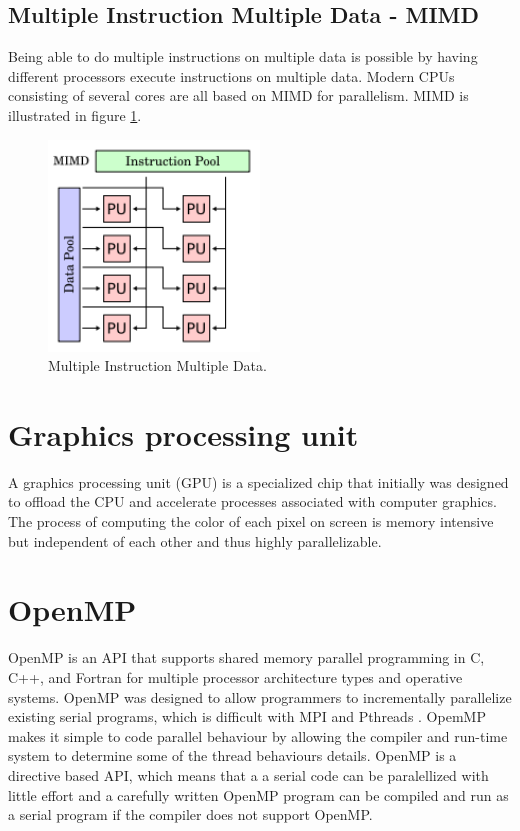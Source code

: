 \subsection*{Multiple Instruction Multiple Data - MIMD}
Being able to do multiple instructions on multiple data is possible by having different processors execute instructions on multiple data. Modern CPUs consisting of several cores are all based on MIMD for parallelism. MIMD is illustrated in figure \ref{MIMD}.
\begin{figure}[h!]
\centering
\includegraphics[width=0.50\textwidth]{parallel/MIMD}
\caption{Multiple Instruction Multiple Data.}
\label{MIMD}
\end{figure}

\section{Graphics processing unit}
A graphics processing unit (GPU) is a specialized chip that initially was designed to offload the CPU and accelerate processes associated with computer graphics. The process of computing the color of each pixel on screen is memory intensive but independent of each other and thus highly parallelizable. 

\section{OpenMP}
OpenMP is an API that supports shared memory parallel programming in C, C++, and Fortran for multiple processor architecture types and operative systems. OpenMP was designed to allow programmers to incrementally parallelize existing serial programs, which is difficult with MPI and Pthreads \cite{peter11}. OpemMP makes it simple to code parallel behaviour by allowing the compiler and run-time system to determine some of the thread behaviours details. OpenMP is a directive based API, which means that a a serial code can be paralellized with little effort and a carefully written OpenMP program can be compiled and run as a serial program if the compiler does not support OpenMP. 


